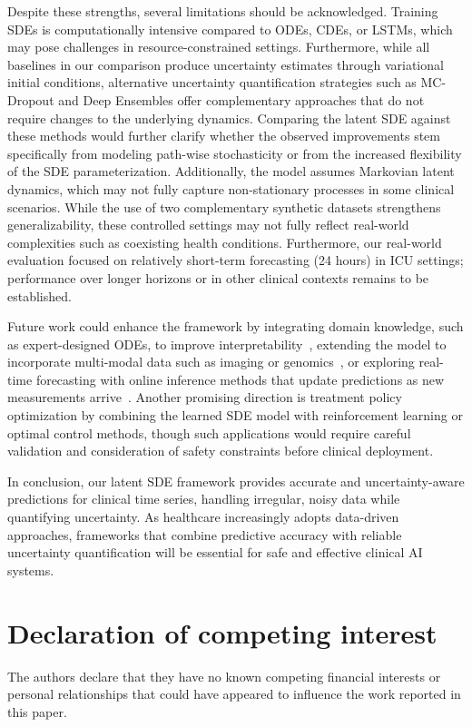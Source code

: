 \documentclass[preprint,12pt]{elsarticle}
\begin{document}
Despite these strengths, several limitations should be acknowledged. Training SDEs is computationally intensive compared to ODEs, CDEs, or LSTMs, which may pose challenges in resource-constrained settings. Furthermore, while all baselines in our comparison produce uncertainty estimates through variational initial conditions, alternative uncertainty quantification strategies such as MC-Dropout and Deep Ensembles offer complementary approaches that do not require changes to the underlying dynamics. Comparing the latent SDE against these methods would further clarify whether the observed improvements stem specifically from modeling path-wise stochasticity or from the increased flexibility of the SDE parameterization. Additionally, the model assumes Markovian latent dynamics, which may not fully capture non-stationary processes in some clinical scenarios. While the use of two complementary synthetic datasets strengthens generalizability, these controlled settings may not fully reflect real-world complexities such as coexisting health conditions. Furthermore, our real-world evaluation focused on relatively short-term forecasting (24 hours) in ICU settings; performance over longer horizons or in other clinical contexts remains to be established.

Future work could enhance the framework by integrating domain knowledge, such as expert-designed ODEs, to improve interpretability~\citep{qian2021integrating}, extending the model to incorporate multi-modal data such as imaging or genomics~\citep{bazgir2023integration, vanguri2022multimodal}, or exploring real-time forecasting with online inference methods that update predictions as new measurements arrive~\citep{zhang2025intelligent, lim2024real}. Another promising direction is treatment policy optimization by combining the learned SDE model with reinforcement learning or optimal control methods, though such applications would require careful validation and consideration of safety constraints before clinical deployment.

In conclusion, our latent SDE framework provides accurate and uncertainty-aware predictions for clinical time series, handling irregular, noisy data while quantifying uncertainty. As healthcare increasingly adopts data-driven approaches, frameworks that combine predictive accuracy with reliable uncertainty quantification will be essential for safe and effective clinical AI systems.



\section*{Declaration of competing interest}
The authors declare that they have no known competing financial interests or personal relationships that could have appeared to influence the work reported in this paper.
\end{document}
